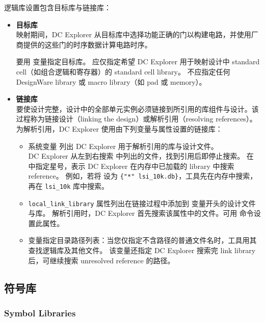 逻辑库设置包含目标库与链接库：
\begin{itemize}
  \item \textbf{目标库}\\
        映射期间，DC Explorer 从目标库中选择功能正确的门以构建电路，并使用厂商提供的这些门的时序数据计算电路时序。

        要用  变量指定目标库。
        应仅指定希望 DC Explorer 用于映射设计中 standard cell（如组合逻辑和寄存器）的 standard cell library。
        不应指定任何 DesignWare library 或 macro library（如 pad 或 memory）。

  \item \textbf{链接库}\\
        要使设计完整，设计中的全部单元实例必须链接到所引用的库组件与设计。该过程称为链接设计（linking the design）或解析引用（resolving references）。
        为解析引用，DC Explorer 使用由下列变量与属性设置的链接库：
        \begin{itemize}
          \item 系统变量  列出 DC Explorer 用于解析引用的库与设计文件。\\
                DC Explorer 从左到右搜索  中列出的文件，找到引用后即停止搜索。
                在  中指定星号，表示 DC Explorer 在内存中已加载的 library 中搜索 reference。
                例如，若将  设为 \texttt{\{"*" lsi\_10k.db\}}，工具先在内存中搜索，再在 \texttt{lsi\_10k} 库中搜索。

          \item \texttt{local\_link\_library} 属性列出在链接过程中添加到  变量开头的设计文件与库。
                解析引用时，DC Explorer 首先搜索该属性中的文件。可用  命令设置此属性。

          \item {} 变量指定目录路径列表：当您仅指定不含路径的普通文件名时，工具用其查找逻辑库及其他文件。
                该变量还指定 DC Explorer 搜索完 link library 后，可继续搜索 unresolved reference 的路径。
        \end{itemize}
\end{itemize}

\subsection{符号库}
\subsubsection*{Symbol Libraries}

